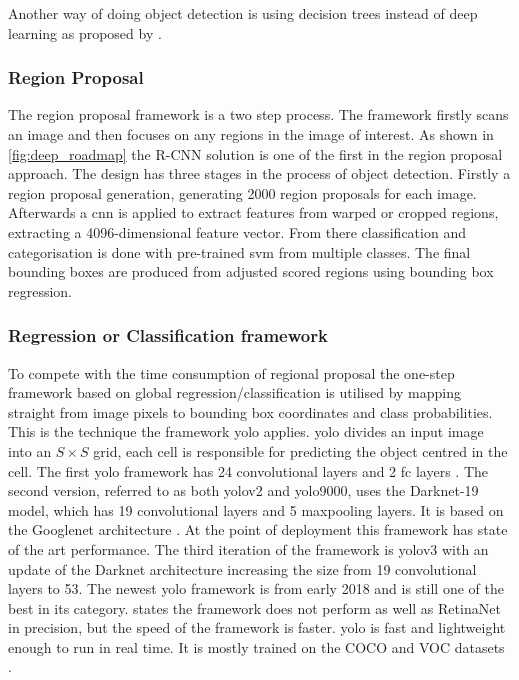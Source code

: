 Another way of doing object detection is using decision trees instead of deep learning as proposed by \cite{Gall2012}.

\subsubsection{Region Proposal}
The region proposal framework is a two step process. The framework firstly scans an image and then focuses on any regions in the image of interest. As shown in \autoref{fig:deep_roadmap} the R-CNN solution is one of the first in the region proposal approach. The design has three stages in the process of object detection. Firstly a region proposal generation, generating 2000 region proposals for each image. Afterwards a \gls{cnn} is applied to extract features from warped or cropped regions, extracting a 4096-dimensional feature vector. From there classification and categorisation is done with pre-trained \gls{svm} from multiple classes. The final bounding boxes are produced from adjusted scored regions using bounding box regression.

\subsubsection{Regression or Classification framework}
To compete with the time consumption of regional proposal the one-step framework based on global regression/classification is utilised by mapping straight from image pixels to bounding box coordinates and class probabilities.
This is the technique the framework \gls{yolo} applies. \gls{yolo} divides an input image into an $S \times S$ grid, each cell is responsible for predicting the object centred in the cell.
The first \gls{yolo} framework has 24 convolutional layers and 2 \gls{fc} layers \citep{zhao}. The second version, referred to as both \gls{yolo}v2 and \gls{yolo}9000, uses the Darknet-19 model, which has 19 convolutional layers and 5 maxpooling layers. It is based on the Googlenet architecture \citep{Redmon2016}. At the point of deployment this framework has state of the art performance. The third iteration of the framework is \gls{yolo}v3 with an update of the Darknet architecture increasing the size from 19 convolutional layers to 53. The newest \gls{yolo} framework is from early 2018 and is still one of the best in its category. \cite{Redmon2018} states the framework does not perform as well as RetinaNet in precision, but the speed of the framework is faster. \gls{yolo} is fast and lightweight enough to run in real time. It is mostly trained on the COCO and VOC datasets \citep{Redmon2018}.

